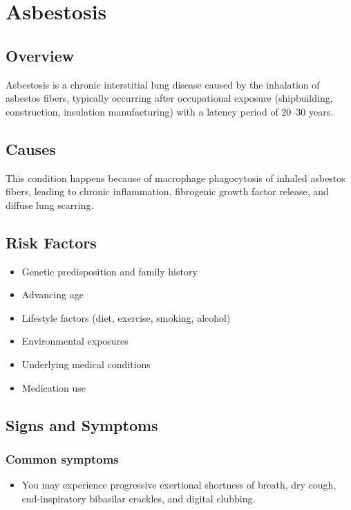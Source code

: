 \chapter{Asbestosis}
\label{sec:Asbestosis}

\section{Overview}
Asbestosis is a chronic interstitial lung disease caused by the inhalation of asbestos fibers, typically occurring after occupational exposure (shipbuilding, construction, insulation manufacturing) with a latency period of 20--30 years.
\section{Causes}
This condition happens because of macrophage phagocytosis of inhaled asbestos fibers, leading to chronic inflammation, fibrogenic growth factor release, and diffuse lung scarring.     
\section{Risk Factors}

\begin{itemize}[noitemsep]
  \item Genetic predisposition and family history
  \item Advancing age
  \item Lifestyle factors (diet, exercise, smoking, alcohol)
  \item Environmental exposures
  \item Underlying medical conditions
  \item Medication use
\end{itemize}
\section{Signs and Symptoms}

\subsection{Common symptoms}
\begin{itemize}[noitemsep]
  \item You may experience progressive exertional shortness of breath, dry cough, end-inspiratory bibasilar crackles, and digital clubbing. 
  \end{itemize}

